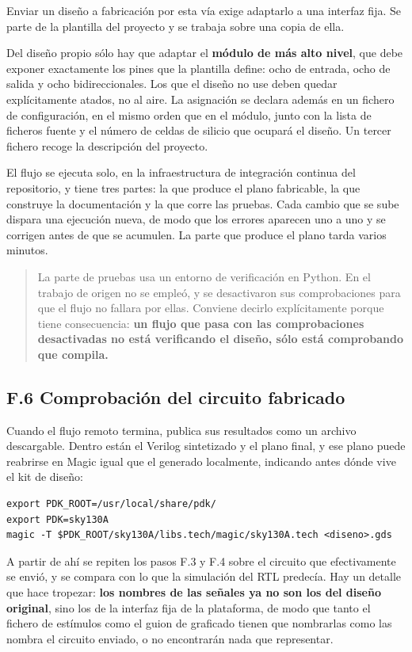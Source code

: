 Enviar un diseño a fabricación por esta vía exige adaptarlo a una
interfaz fija. Se parte de la plantilla del proyecto y se trabaja sobre
una copia de ella.

Del diseño propio sólo hay que adaptar el \textbf{módulo de más alto
nivel}, que debe exponer exactamente los pines que la plantilla define:
ocho de entrada, ocho de salida y ocho bidireccionales. Los que el
diseño no use deben quedar explícitamente atados, no al aire. La
asignación se declara además en un fichero de configuración, en el mismo
orden que en el módulo, junto con la lista de ficheros fuente y el
número de celdas de silicio que ocupará el diseño. Un tercer fichero
recoge la descripción del proyecto.

El flujo se ejecuta solo, en la infraestructura de integración continua
del repositorio, y tiene tres partes: la que produce el plano
fabricable, la que construye la documentación y la que corre las
pruebas. Cada cambio que se sube dispara una ejecución nueva, de modo
que los errores aparecen uno a uno y se corrigen antes de que se
acumulen. La parte que produce el plano tarda varios minutos.

\begin{quote}
La parte de pruebas usa un entorno de verificación en Python. En el
trabajo de origen no se empleó, y se desactivaron sus comprobaciones
para que el flujo no fallara por ellas. Conviene decirlo explícitamente
porque tiene consecuencia: \textbf{un flujo que pasa con las
comprobaciones desactivadas no está verificando el diseño, sólo está
comprobando que compila.}
\end{quote}

\subsection{F.6 Comprobación del circuito
fabricado}\label{f.6-comprobaciuxf3n-del-circuito-fabricado}

Cuando el flujo remoto termina, publica sus resultados como un archivo
descargable. Dentro están el Verilog sintetizado y el plano final, y ese
plano puede reabrirse en Magic igual que el generado localmente,
indicando antes dónde vive el kit de diseño:

\begin{verbatim}
export PDK_ROOT=/usr/local/share/pdk/
export PDK=sky130A
magic -T $PDK_ROOT/sky130A/libs.tech/magic/sky130A.tech <diseno>.gds
\end{verbatim}

A partir de ahí se repiten los pasos F.3 y F.4 sobre el circuito que
efectivamente se envió, y se compara con lo que la simulación del RTL
predecía. Hay un detalle que hace tropezar: \textbf{los nombres de las
señales ya no son los del diseño original}, sino los de la interfaz fija
de la plataforma, de modo que tanto el fichero de estímulos como el
guion de graficado tienen que nombrarlas como las nombra el circuito
enviado, o no encontrarán nada que representar.

